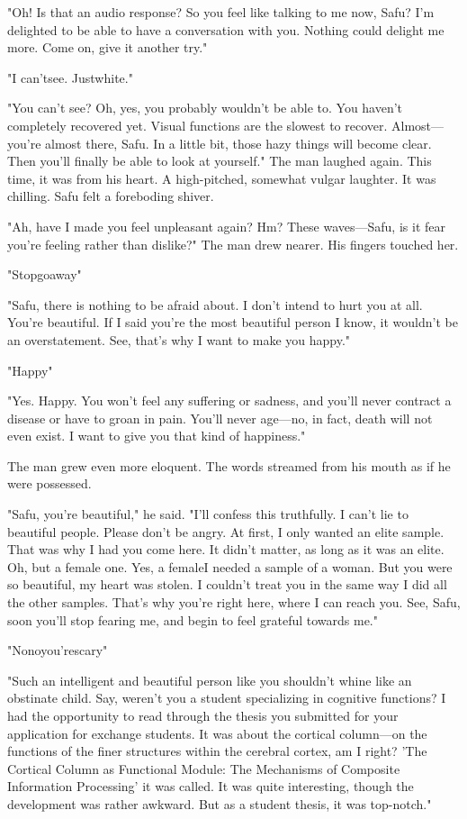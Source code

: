 "Oh! Is that an audio response? So you feel like talking to me now,
Safu? I'm delighted to be able to have a conversation with you. Nothing
could delight me more. Come on, give it another try."

"I can't\el see. Just\el white."

"You can't see? Oh, yes, you probably wouldn't be able to. You haven't
completely recovered yet. Visual functions are the slowest to recover.
Almost---you're almost there, Safu. In a little bit, those hazy things
will become clear. Then you'll finally be able to look at yourself." The
man laughed again. This time, it was from his heart. A high-pitched,
somewhat vulgar laughter. It was chilling. Safu felt a foreboding
shiver.

"Ah, have I made you feel unpleasant again? Hm? These waves---Safu, is it
fear you're feeling rather than dislike?" The man drew nearer. His
fingers touched her.

"Stop\el go\el away\el "

"Safu, there is nothing to be afraid about. I don't intend to hurt you
at all. You're beautiful. If I said you're the most beautiful person I
know, it wouldn't be an overstatement. See, that's why I want to make
you happy."

"Ha\el ppy\el "

"Yes. Happy. You won't feel any suffering or sadness, and you'll never
contract a disease or have to groan in pain. You'll never age---no, in
fact, death will not even exist. I want to give you that kind of
happiness."

The man grew even more eloquent. The words streamed from his mouth as if
he were possessed.

"Safu, you're beautiful," he said. "I'll confess this truthfully. I
can't lie to beautiful people. Please don't be angry. At first, I only
wanted an elite sample. That was why I had you come here. It didn't
matter, as long as it was an elite. Oh, but a female one. Yes, a
female\el I needed a sample of a woman. But you were so beautiful, my
heart was stolen. I couldn't treat you in the same way I did all the
other samples. That's why you're right here, where I can reach you. See,
Safu, soon you'll stop fearing me, and begin to feel grateful towards
me."

"No\el no\el you're\el scary\el "

"Such an intelligent and beautiful person like you shouldn't whine like
an obstinate child. Say, weren't you a student specializing in cognitive
functions? I had the opportunity to read through the thesis you
submitted for your application for exchange students. It was about the
cortical column---on the functions of the finer structures within the
cerebral cortex, am I right? 'The Cortical Column as Functional Module:
The Mechanisms of Composite Information Processing' it was called. It
was quite interesting, though the development was rather awkward. But as
a student thesis, it was top-notch."

